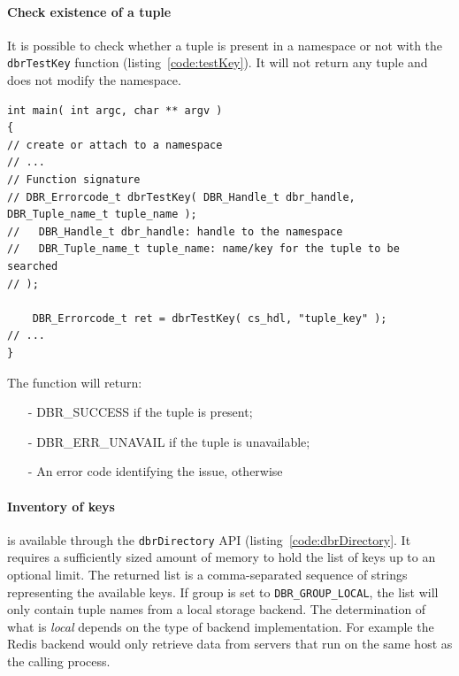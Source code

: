 \paragraph{Check existence of a tuple} It is possible to check whether a tuple is present in a namespace or not with the \texttt{dbrTestKey} function (listing~\ref{code:testKey}). It will not return any tuple and does not modify the namespace.

\begin{lstlisting}[style=mystyle,basicstyle=\scriptsize\ttfamily,caption=Check for the existence of a tuple in the \databroker, label=code:testKey]
int main( int argc, char ** argv )
{
// create or attach to a namespace
// ...
// Function signature
// DBR_Errorcode_t dbrTestKey( DBR_Handle_t dbr_handle, DBR_Tuple_name_t tuple_name );
//   DBR_Handle_t dbr_handle: handle to the namespace
//   DBR_Tuple_name_t tuple_name: name/key for the tuple to be searched
// );

	DBR_Errorcode_t ret = dbrTestKey( cs_hdl, "tuple_key" );
// ...
}
\end{lstlisting}

The function will return:
\begin{itemize}
	\item[-] DBR\_SUCCESS if the tuple is present;
	\item[-] DBR\_ERR\_UNAVAIL if the tuple is unavailable;
	\item[-] An error code identifying the issue, otherwise
\end{itemize}




\paragraph{Inventory of keys} is available through the
\texttt{dbrDirectory} API (listing~\ref{code:dbrDirectory}. It
requires a sufficiently sized amount of memory to hold the list of
keys up to an optional limit. The returned list is a comma-separated
sequence of strings representing the available keys. If group is set
to \texttt{DBR\_GROUP\_LOCAL}, the list will only contain tuple names
from a local storage backend.  The determination of what is
\emph{local} depends on the type of backend implementation. For
example the Redis backend would only retrieve data from servers that
run on the same host as the calling process.

